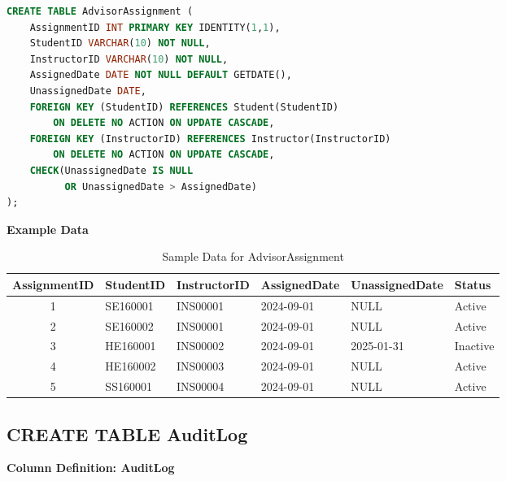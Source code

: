 \documentclass[12pt,a4paper]{report}
\begin{document}
\begin{lstlisting}[language=SQL, caption=Create Table AdvisorAssignment]
CREATE TABLE AdvisorAssignment (
    AssignmentID INT PRIMARY KEY IDENTITY(1,1),
    StudentID VARCHAR(10) NOT NULL,
    InstructorID VARCHAR(10) NOT NULL,
    AssignedDate DATE NOT NULL DEFAULT GETDATE(),
    UnassignedDate DATE,
    FOREIGN KEY (StudentID) REFERENCES Student(StudentID) 
        ON DELETE NO ACTION ON UPDATE CASCADE,
    FOREIGN KEY (InstructorID) REFERENCES Instructor(InstructorID) 
        ON DELETE NO ACTION ON UPDATE CASCADE,
    CHECK(UnassignedDate IS NULL 
          OR UnassignedDate > AssignedDate)
);
\end{lstlisting}

\textbf{Example Data}

\begin{table}[ht]
\centering
\small
\begin{tabular}{|c|l|l|l|l|l|}
\hline
\textbf{AssignmentID} & \textbf{StudentID} & \textbf{InstructorID} & \textbf{AssignedDate} & \textbf{UnassignedDate} & \textbf{Status} \\ \hline
1 & SE160001 & INS00001 & 2024-09-01 & NULL & Active \\ \hline
2 & SE160002 & INS00001 & 2024-09-01 & NULL & Active \\ \hline
3 & HE160001 & INS00002 & 2024-09-01 & 2025-01-31 & Inactive \\ \hline
4 & HE160002 & INS00003 & 2024-09-01 & NULL & Active \\ \hline
5 & SS160001 & INS00004 & 2024-09-01 & NULL & Active \\ \hline
\end{tabular}
\caption{Sample Data for AdvisorAssignment}
\label{tab:advisor_assignment_data}
\end{table}

\vspace{6cm}

\subsection{CREATE TABLE AuditLog}

\textbf{Column Definition: AuditLog}
\end{document}
